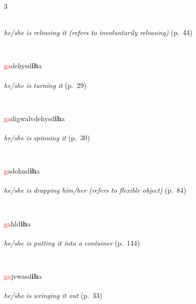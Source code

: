 \documentclass[oneside,openany]{book}%
\begin{document}
\begin{multicols}{3}
\begin{minipage}[t]{\linewidth}
\\
\noindent \textit{he/she is releasing it (refers to involuntarily releasing)} (p.~44)
\end{minipage}\\[1em]%
\begin{minipage}[t]{\linewidth}
\raggedright\noindent \textcolor{Red}{ga}dehysd\textbf{ih}a\\
\\
\noindent \textit{he/she is turning it} (p.~29)
\end{minipage}\\[1em]%
\begin{minipage}[t]{\linewidth}
\raggedright\noindent \textcolor{Red}{ga}digwalvdehysd\textbf{ih}a\\
\\
\noindent \textit{he/she is spinning it} (p.~30)
\end{minipage}\\[1em]%
\begin{minipage}[t]{\linewidth}
\raggedright\noindent \textcolor{Red}{g}adohnd\textbf{ih}a\\
\\
\noindent \textit{he/she is dropping him/her (refers to flexible object)} (p.~84)
\end{minipage}\\[1em]%
\begin{minipage}[t]{\linewidth}
\raggedright\noindent \textcolor{Red}{ga}hld\textbf{ih}a\\
\\
\noindent \textit{he/she is putting it into a container} (p.~144)
\end{minipage}\\[1em]%
\begin{minipage}[t]{\linewidth}
\raggedright\noindent \textcolor{Red}{ga}jvwasd\textbf{ih}a\\
\\
\noindent \textit{he/she is wringing it out} (p.~33)
\end{minipage}\\[1em]%

\end{multicols}
\end{document}
